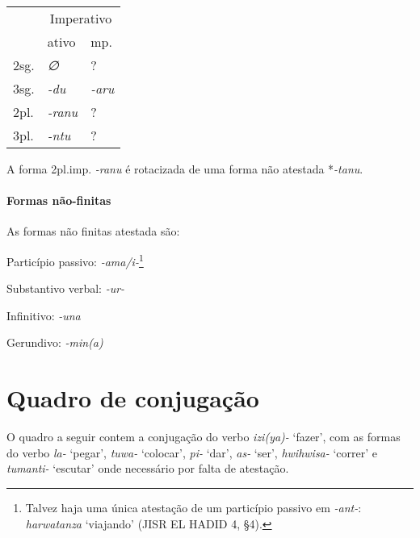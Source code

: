 \begin{center}
	\begin{tabular}[c]{lll}
		\toprule
		     & \multicolumn{2}{c}{Imperativo}               \\
		     & ativo                          & mp.         \\
		\midrule
		2sg. & \emph{∅}                       & {?}         \\
		3sg. & \emph{-du}                     & \emph{-aru} \\
		\midrule
		2pl. & \emph{-ranu}                   & {?}         \\
		3pl. & \emph{-ntu}                    & {?}         \\
		\bottomrule
	\end{tabular}
\end{center}

\noindent A forma 2pl.imp. \emph{-ranu} é rotacizada de uma forma não atestada
*\emph{-tanu}.

\paragraph{Formas não-finitas}
As formas não finitas atestada são:

\begin{compactitem}
	\item Particípio passivo: \emph{-ama\slash{}i-}\footnote{Talvez haja uma única
		atestação de um particípio passivo em \emph{-ant-}: \emph{harwatanza}
		`viajando' (JISR EL HADID 4, §4).}
	\item Substantivo verbal: \emph{-ur-}
	\item Infinitivo: \emph{-una}
	\item Gerundivo: \emph{-min{(a)}}
\end{compactitem}



\section{Quadro de conjugação}

O quadro a seguir contem a conjugação do verbo \emph{izi{(ya)}-} `fazer', com as
formas do verbo \emph{la-} `pegar', \emph{tuwa-} `colocar', \emph{pi-} `dar',
\emph{as-} `ser', \emph{hwihwisa-}
`correr' e \emph{tumanti-} `escutar' onde necessário por falta de atestação.


